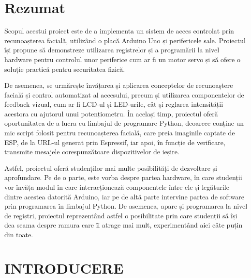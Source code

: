 \documentclass[a4paper,12pt]{report}
\begin{document}



\newpage
\setcounter{page}{2}

\tableofcontents
\newpage


\chapter*{Rezumat}

Scopul acestui proiect este de a implementa un sistem de acces controlat prin recunoașterea facială, utilizând o placă Arduino Uno și perifericele sale. Proiectul își propune să demonstreze utilizarea registrelor și a programării la nivel hardware pentru controlul unor periferice cum ar fi un motor servo și să ofere o soluție practică pentru securitatea fizică. 

De asemenea, se urmărește învățarea și aplicarea conceptelor de recunoaștere facială și control automatizat al accesului, precum și utilizarea componentelor de feedback vizual, cum ar fi LCD-ul și LED-urile, cât și reglarea intensității acestora cu ajutorul unui potențiometru. În același timp, proiectul oferă oportunitatea de a lucra cu limbajul de programare Python, deoarece conține un mic script folosit pentru recunoașterea facială, care preia imaginile captate de ESP, de la URL-ul generat prin Espressif, iar apoi, în funcție de verificare, transmite mesajele corespunzătoare dispozitivelor de ieșire.

Astfel, proiectul oferă studenților mai multe posibilități de dezvoltare și aprofundare. Pe de o parte, este vorba despre partea hardware, în care studenții vor învăța modul în care interacționează componentele între ele și legăturile dintre acestea datorită Arduino, iar pe de altă parte intervine partea de software prin programarea în limbajul Python. De asemenea, apare și programarea la nivel de regiștri, proiectul reprezentând astfel o posibilitate prin care studenții să își dea seama despre ramura care îi atrage mai mult, experimentând aici câte puțin din toate.

\newpage

\chapter*{INTRODUCERE}
\end{document}
